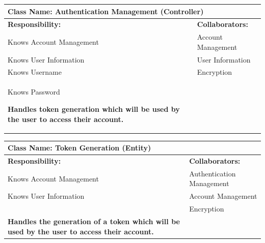 \documentclass[]{article}
\begin{document}
\begin{itemize}
     	\begin{table}[ht]
		\centering
		\begin{tabular}{|p{7cm}|p{7cm}|}
		\hline 
		\multicolumn{2}{|l|}{\textbf{Class Name:} Authentication Management (Controller)} \\
		\hline
		\textbf{Responsibility:} & \textbf{Collaborators:} \\
		\hline
            Knows Account Management & Account Management\\
            
            Knows User Information & User Information\\
            Knows Username & Encryption\\
            Knows Password\
            
            \vspace{0.1in}
            \textbf{Handles token generation which will be used by the user to access their account.}

		\vspace{1in} & \\
		\hline
  
		\end{tabular}
	\end{table}
 

	\begin{table}[ht]
		\centering
		\begin{tabular}{|p{7cm}|p{7cm}|}
		\hline 
		 \multicolumn{2}{|l|}{\textbf{Class Name:} Token Generation (Entity)} \\
		\hline
		\textbf{Responsibility:} & \textbf{Collaborators:} \\
		\hline
            Knows Account Management & Authentication Management\\
            
            Knows User Information & Account Management\\
            & Encryption\\
            
            \vspace{0.1in}
            \textbf{Handles the generation of a token which will be used by the user to access their account.}

		\vspace{1in} & \\
		\hline
  
		\end{tabular}
	\end{table}


\end{itemize}
\end{document}
